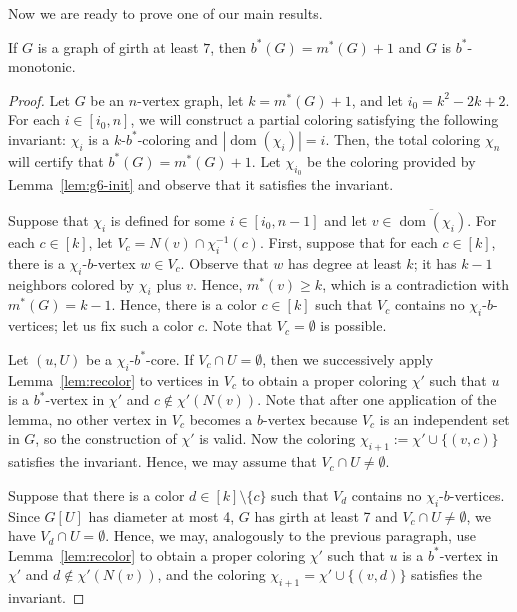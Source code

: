 \documentclass[runningheads, envcountsame]{llncs}
\DeclareMathOperator{\dom}{dom}
\begin{document}
Now we are ready to prove one of our main results.

\begin{theorem}\label{thm:girth7}
If $G$ is a graph of girth at least $7$, then $b^*(G) = m^*(G) + 1$ and $G$ is $b^*$-monotonic.
\end{theorem}
\begin{proof}
Let $G$ be an $n$-vertex graph, let $k = m^*(G) + 1$, and let $i_0 = k^2 - 2k + 2$.
For each $i \in [i_0, n]$, we will construct a partial coloring satisfying the following invariant: $\chi_i$ is a $k$-$b^*$-coloring and $|\dom(\chi_i)| = i$. 
Then, the total coloring $\chi_n$ will certify that $b^*(G) = m^*(G) + 1$.
Let $\chi_{i_0}$ be the coloring provided by Lemma~\ref{lem:g6-init} and observe that it satisfies the invariant.

Suppose that $\chi_i$ is defined for some $i \in [i_0, n-1]$ and let $v \in \overline{\dom(\chi_i)}$.
For each $c \in [k]$, let $V_c = N(v) \cap \chi_i^{-1}(c)$.
First, suppose that for each $c \in [k]$, there is a $\chi_i$-$b$-vertex $w \in V_c$.
Observe that $w$ has degree at least $k$; it has $k-1$ neighbors colored by $\chi_i$ plus $v$.
Hence, $m^*(v) \ge k$, which is a contradiction with $m^*(G) = k-1$.
Hence, there is a color $c \in [k]$ such that $V_c$ contains no $\chi_i$-$b$-vertices; let us fix such a color $c$. Note that $V_c = \emptyset$ is possible.

Let $(u, U)$ be a $\chi_i$-$b^*$-core.
If $V_c \cap U = \emptyset$, then we successively apply Lemma~\ref{lem:recolor} to vertices in $V_c$ to obtain a proper coloring $\chi'$ such that $u$ is a $b^*$-vertex in $\chi'$ and $c \notin \chi'(N(v))$.
Note that after one application of the lemma, no other vertex in $V_c$ becomes a $b$-vertex because $V_c$ is an independent set in $G$, so the construction of $\chi'$ is valid.
Now the coloring $\chi_{i+1} := \chi' \cup \{(v, c)\}$ satisfies the invariant.
Hence, we may assume that $V_c \cap U \ne \emptyset$.

Suppose that there is a color $d \in [k] \setminus \{c\}$ such that $V_d$ contains no $\chi_i$-$b$-vertices.
Since $G[U]$ has diameter at most 4, $G$ has girth at least 7 and $V_c \cap U \ne \emptyset$, we have $V_d \cap U = \emptyset$.
Hence, we may, analogously to the previous paragraph, use Lemma~\ref{lem:recolor} to obtain a proper coloring $\chi'$ such that $u$ is a $b^*$-vertex in $\chi'$ and $d \notin \chi'(N(v))$, and the coloring $\chi_{i+1} = \chi' \cup \{(v, d)\}$ satisfies the invariant.


\end{proof}
\end{document}
